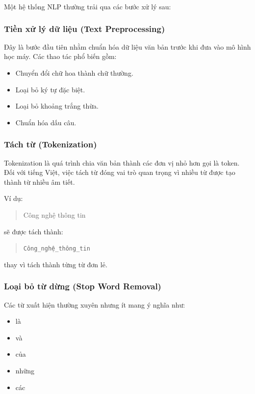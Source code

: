 \documentclass[12pt,a4paper]{report}
\begin{document}
	Một hệ thống NLP thường trải qua các bước xử lý sau:
	
	\subsubsection{Tiền xử lý dữ liệu (Text Preprocessing)}
	
	Đây là bước đầu tiên nhằm chuẩn hóa dữ liệu văn bản trước khi đưa vào mô hình học máy. Các thao tác phổ biến gồm:
	
	\begin{itemize}
		\item Chuyển đổi chữ hoa thành chữ thường.
		\item Loại bỏ ký tự đặc biệt.
		\item Loại bỏ khoảng trắng thừa.
		\item Chuẩn hóa dấu câu.
	\end{itemize}
	
	\subsubsection{Tách từ (Tokenization)}
	
	Tokenization là quá trình chia văn bản thành các đơn vị nhỏ hơn gọi là token. Đối với tiếng Việt, việc tách từ đóng vai trò quan trọng vì nhiều từ được tạo thành từ nhiều âm tiết.
	
	Ví dụ:
	
	\begin{quote}
		Công nghệ thông tin
	\end{quote}
	
	sẽ được tách thành:
	
	\begin{quote}
		\texttt{Công\_nghệ\_thông\_tin}
	\end{quote}
	
	thay vì tách thành từng từ đơn lẻ.
	
	\subsubsection{Loại bỏ từ dừng (Stop Word Removal)}
	
	Các từ xuất hiện thường xuyên nhưng ít mang ý nghĩa như:
	
	\begin{itemize}
		\item là
		\item và
		\item của
		\item những
		\item các
	\end{itemize}
	
\end{document}
